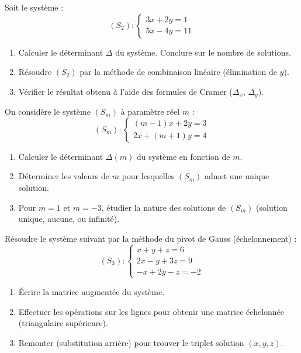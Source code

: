 \documentclass[11pt]{article}
\begin{document}
\begin{exercice}
Soit le système :
\[
(S_2) : \begin{cases} 3x + 2y = 1 \\ 5x - 4y = 11 \end{cases}
\]
\begin{enumerate}
    \item Calculer le déterminant $\Delta$ du système. Conclure sur le nombre de solutions.
    \item Résoudre $(S_2)$ par la méthode de combinaison linéaire (élimination de $y$).
    \item Vérifier le résultat obtenu à l'aide des formules de Cramer ($\Delta_x$, $\Delta_y$).
\end{enumerate}
\end{exercice}

\begin{exercice}
On considère le système $(S_m)$ à paramètre réel $m$ :
\[
(S_m) : \begin{cases} (m-1)x + 2y = 3 \\ 2x + (m+1)y = 4 \end{cases}
\]
\begin{enumerate}
    \item Calculer le déterminant $\Delta(m)$ du système en fonction de $m$.
    \item Déterminer les valeurs de $m$ pour lesquelles $(S_m)$ admet une unique solution.
    \item Pour $m = 1$ et $m = -3$, étudier la nature des solutions de $(S_m)$ (solution unique, aucune, ou infinité).
\end{enumerate}
\end{exercice}

\begin{exercice}
Résoudre le système suivant par la méthode du pivot de Gauss (échelonnement) :
\[
(S_3) : \begin{cases} x + y + z = 6 \\ 2x - y + 3z = 9 \\ -x + 2y - z = -2 \end{cases}
\]
\begin{enumerate}
    \item Écrire la matrice augmentée du système.
    \item Effectuer les opérations sur les lignes pour obtenir une matrice échelonnée (triangulaire supérieure).
    \item Remonter (substitution arrière) pour trouver le triplet solution $(x, y, z)$.
\end{enumerate}
\end{exercice}
\end{document}
